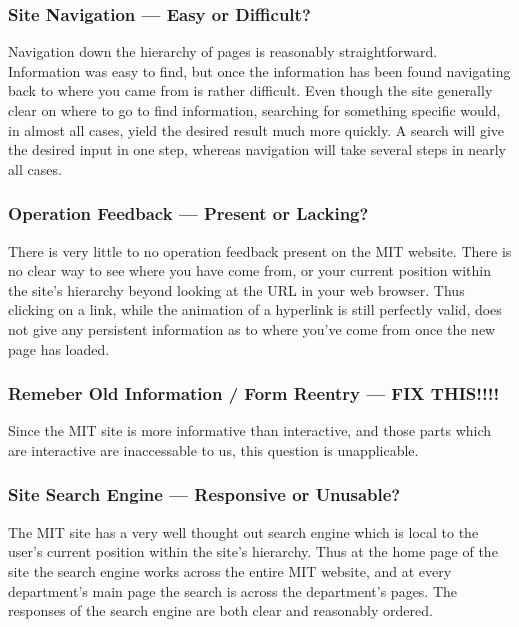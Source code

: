 \subsubsection*{Site Navigation --- Easy or Difficult?}

Navigation down the hierarchy of pages is reasonably straightforward. Information
was easy to find, but once the information has been found navigating back to where
you came from is rather difficult. Even though the site generally clear on where to
go to find information, searching for something specific would, in almost all cases,
yield the desired result much more quickly. A search will give the desired input in
one step, whereas navigation will take several steps in nearly all cases.

\subsubsection*{Operation Feedback --- Present or Lacking?}

There is very little to no operation feedback present on the MIT website. There is no 
clear way to see where you have come from, or your current
position within the site's hierarchy beyond looking at the URL in your web browser. Thus
clicking on a link, while the animation of a hyperlink is still perfectly valid, does not
give any persistent information as to where you've come from once the new page has loaded.

\subsubsection*{Remeber Old Information / Form Reentry --- FIX THIS!!!!}

Since the MIT site is more informative than interactive, and those parts which are interactive
are inaccessable to us, this question is unapplicable.

\subsubsection*{Site Search Engine --- Responsive or Unusable?}

The MIT site has a very well thought out search engine which is local to the user's current
position within the site's hierarchy. Thus at the home page of the site the search engine
works across the entire MIT website, and at every department's main page the search is
across the department's pages. The responses of the search engine are both clear and
reasonably ordered.

